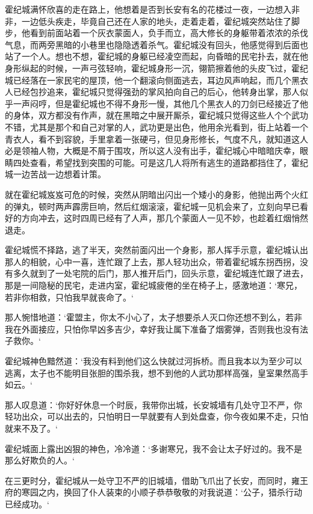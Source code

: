 霍纪城满怀欣喜的走在路上，他想着是否到长安有名的花楼过一夜，一边想入非非，一边低头疾走，毕竟自己还在人家的地头，走着走着，霍纪城突然站住了脚步，他看到前面站着一个灰衣蒙面人，负手而立，高大修长的身躯带着浓浓的杀伐气息，而两旁黑暗的小巷里也隐隐透着杀气。霍纪城没有回头，他感觉得到后面也站了一个人。想也不想，霍纪城的身躯已经凌空而起，向昏暗的民宅扑去，就在他身形纵起的时候，一声弓弦轻响，霍纪城身形一沉，翎箭擦着他的头皮飞过，霍纪城已经落在一家民宅的屋顶，他一个翻滚向侧面逃去，耳边风声响起，而几个黑衣人已经包抄追来，霍纪城只觉得强劲的掌风拍向自己的后心，他转身出掌，那人似乎一声闷哼，但是霍纪城也不得不身形一慢，其他几个黑衣人的刀剑已经接近了他的身体，双方都没有作声，就在黑暗之中展开厮杀，霍纪城只觉得这些人个个武功不错，尤其是那个和自己对掌的人，武功更是出色，他用余光看到，街上站着一个青衣人，看不到容貌，手里拿着一张硬弓，但见身形修长，气度不凡，就知道这人必是领袖人物，大概是不屑于围攻，所以这人没有出手，霍纪城心中暗暗庆幸，眼睛四处查看，希望找到突围的可能。可是这几人将所有逃生的道路都挡住了，霍纪城一边苦战一边想着计策。

就在霍纪城岌岌可危的时候，突然从阴暗出闪出一个矮小的身影，他抛出两个火红的弹丸，顿时两声霹雳巨响，然后红烟滚滚，霍纪城一见机会来了，立刻向早已看好的方向冲去，这时四周已经有了人声，那几个蒙面人一见不妙，也趁着红烟悄然退走。

霍纪城慌不择路，逃了半天，突然前面闪出一个身影，那人挥手示意，霍纪城认出那人的相貌，心中一喜，连忙跟了上去，那人轻功出众，带着霍纪城东拐西拐，没有多久就到了一处宅院的后门，那人推开后门，回头示意，霍纪城连忙跟了进去，那是一间隐秘的民宅，走进内室，霍纪城疲倦的坐在椅子上，感激地道：‘寒兄，若非你相救，只怕我早就丧命了。‘

那人惋惜地道：‘霍盟主，你太不小心了，太子想要杀人灭口你还想不到么，若非我在外面接应，只怕你早凶多吉少，幸好我让属下准备了烟雾弹，否则我也没有法子救你。‘

霍纪城神色黯然道：‘我没有料到他们这么快就过河拆桥。而且我本以为至少可以逃离，太子也不能明目张胆的围杀我，想不到他的人武功那样高强，皇室果然高手如云。‘

那人叹息道：‘你好好休息一个时辰，我带你出城，长安城墙有几处守卫不严，你轻功出众，可以出去的，只怕明日一早就要有人到处盘查，你今夜如果不走，只怕就来不及了。‘

霍纪城面上露出凶狠的神色，冷冷道：‘多谢寒兄，我不会让太子好过的。我不是那么好欺负的人。‘

在三更时分，霍纪城从一处守卫不严的旧城墙，借助飞爪出了长安，而同时，雍王府的寒园之内，换回了仆人装束的小顺子恭恭敬敬的对我说道：‘公子，猎杀行动已经成功。‘


